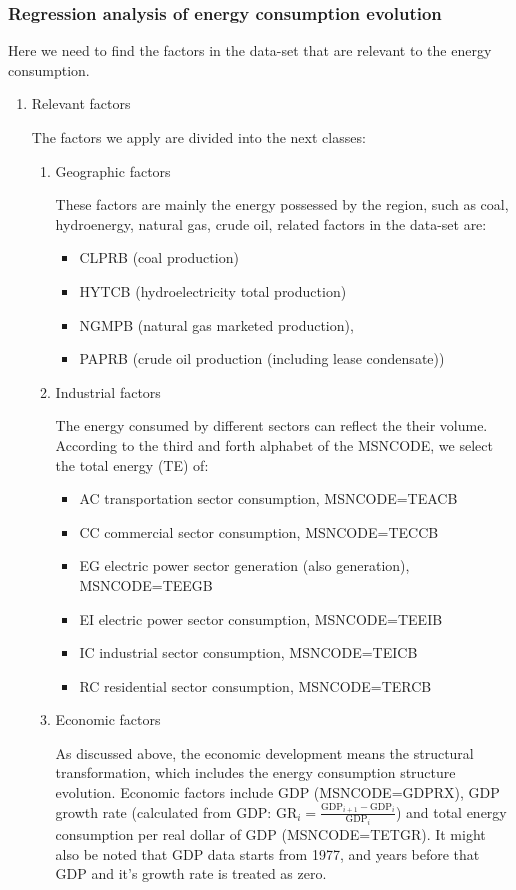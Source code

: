 \subsubsection{Regression analysis of energy consumption evolution}
Here we need to find the factors in the data-set that are relevant to the energy consumption.
\begin{enumerate}
    \item{Relevant factors}\par
The factors we apply are divided into the next classes:
\begin{enumerate}
    \item{Geographic factors}
    \par
    These factors are mainly the energy possessed by the region, such as coal, hydroenergy, natural gas, crude oil, related factors in the data-set are:
    \begin{itemize}
        \item CLPRB (coal production)
        \item HYTCB (hydroelectricity total production)
        \item NGMPB (natural gas marketed production),
        \item PAPRB (crude oil production (including lease condensate))
    \end{itemize}

    \item{Industrial factors}
    \par
    The energy consumed by different sectors can reflect the their volume. According to the third and forth alphabet of the MSNCODE, we select the total energy (TE) of:
    \begin{itemize}
    \item{AC} transportation sector consumption, MSNCODE=TEACB
    \item{CC} commercial sector consumption, MSNCODE=TECCB
    \item{EG} electric power sector generation (also generation), MSNCODE=TEEGB
    \item{EI} electric power sector consumption, MSNCODE=TEEIB
    \item{IC} industrial sector consumption, MSNCODE=TEICB
    \item{RC} residential sector consumption, MSNCODE=TERCB
    \end{itemize}
    \item{Economic factors}
    \par
    As discussed above, the economic development means the structural transformation, which includes the energy consumption structure evolution. Economic factors include GDP (MSNCODE=GDPRX), GDP growth rate (calculated from GDP: $\mathrm{GR}_i=\frac{\mathrm{GDP}_{i+1}-\mathrm{GDP}_{i}}{\mathrm{GDP}_{i}}$) and total energy consumption per real dollar of GDP (MSNCODE=TETGR). It might also be noted that 
    GDP data starts from 1977, and years before that GDP and it's growth rate is treated as zero.
    

\end{enumerate}
\end{enumerate}
